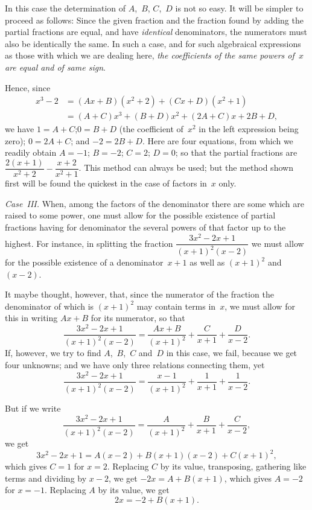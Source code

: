 \documentclass[12pt]{book}[2005/09/16]
\newcommand{\Paragraph}[1]{\medskip\pagebreak[1]\par\textit{#1}}
\newcommand{\DPPageSep}[2]{\Pagelabel{#2}}
\newcommand{\Pagelabel}[1]
  {\phantomsection\label{#1}}
\begin{document}
In this case the determination of $A$,~$B$, $C$,~$D$ is not
so easy. It will be simpler to proceed as follows:
Since the given fraction and the fraction found by
adding the partial fractions are equal, and have
\emph{identical} denominators, the numerators must also be
identically the same. In such a case, and for such
algebraical expressions as those with which we are
dealing here, \emph{the coefficients of the same powers of~$x$
are equal and of same sign}.

Hence, since
\begin{align*}
x^3-2
  &= (Ax+B)(x^2+2) + (Cx+D)(x^2+1) \\
  &= (A+C)x^3 + (B+D)x^2 + (2A+C)x + 2B+D,
\end{align*}
we have $1=A+C$;\quad $0=B+D$ (the coefficient of~$x^2$
in the left expression being zero); $0=2A+C$; and
$-2=2B+D$. Here are four equations, from which
we readily obtain $A=-1$; $B=-2$; $C=2$; $D=0$;
so that the partial fractions are $\dfrac{2(x+1)}{x^2+2} - \dfrac{x+2}{x^2+1}$.
\DPPageSep{139.png}{127}%
This method can always be used; but the method
shown first will be found the quickest in the case of
factors in~$x$ only.

\Paragraph{Case~III\@.} When, among the factors of the denominator
there are some which are raised to some power,
one must allow for the possible existence of partial
fractions having for denominator the several powers
of that factor up to the highest. For instance, in
splitting the fraction $\dfrac{3x^2-2x+1}{(x+1)^2(x-2)}$ we must allow for
the possible existence of a denominator~$x+1$ as well
as $(x+1)^2$ and~$(x-2)$.

It maybe thought, however, that, since the numerator
of the fraction the denominator of which is $(x+1)^2$
may contain terms in~$x$, we must allow for this in
writing $Ax+B$ for its numerator, so that
\[
\frac{3x^2 - 2x + 1}{(x+1)^2(x-2)}
  = \frac{Ax+B}{(x+1)^2} + \frac{C}{x+1} + \frac{D}{x-2}.
\]
If, however, we try to find $A$,~$B$,~$C$ and~$D$ in this case,
we fail, because we get four unknowns; and we have
only three relations connecting them, yet
\[
\frac{3x^2 - 2x + 1}{(x+1)^2(x-2)}
  = \frac{x-1}{(x+1)^2} + \frac{1}{x+1} + \frac{1}{x-2}.
\]

But if we write
\[
\frac{3x^2 - 2x + 1}{(x+1)^2(x-2)}
  = \frac{A}{(x+1)^2} + \frac{B}{x+1} + \frac{C}{x-2},
\]
we get
\[
3x^2 - 2x+1 = A(x-2) + B(x+1)(x-2) + C(x+1)^2,
\]
\DPPageSep{140.png}{128}%
which gives $C=1$ for $x=2$. Replacing $C$ by its value,
transposing, gathering like terms and dividing by
$x-2$, we get $-2x= A+B(x+1)$, which gives $A=-2$
for $x=-1$. Replacing $A$ by its value, we get
\[
2x = -2+B(x+1).
\]
\end{document}
